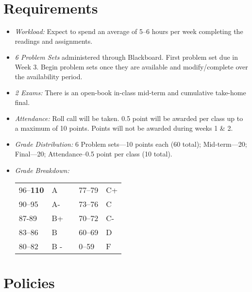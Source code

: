 \documentclass[article,oneside]{memoir}
\begin{document}
\section{Requirements}

\begin{itemize}
\item \textit{Workload:} Expect to spend an average of 5--6 hours per week  completing the readings and assignments.


\item \textit{6 Problem Sets} administered through Blackboard. First problem set due in Week 3. Begin problem sets once they are available and modify/complete over the availability period. 

\item \textit{2 Exams:} There is an open-book in-class mid-term and cumulative take-home final.  

\item \textit{Attendance:} Roll call will be taken. 0.5 point will be awarded per class up to a maximum of 10 points. Points will not be awarded during weeks 1 \& 2. 
 

\item \textit{Grade Distribution:} 6 Problem sets---10 points each (60 total); Mid-term---20; Final---20; Attendance--0.5 point per class (10 total).

\item \textit{Grade Breakdown:}

 \begin{tabular}{ | l | l | p{2cm} | l | l | }
    \hline 
96--\textbf{110} & A  & &  77--79 &  C+ \\  
90--95 & A- & &  73--76 & C \\
87-89 & B+ &  &  70--72 & C- \\ 
83--86 & B  & &  60--69 & D\\
80--82 & B - & & 0--59 & F\\ \hline
    \end{tabular}


\end{itemize}




\section{Policies}
\end{document}
